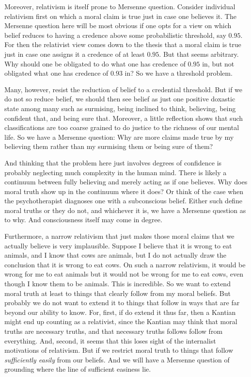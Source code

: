 Moreover, relativism is itself prone to
Mersenne question. Consider individual relativism first on which a moral claim is true just in case one believes
it. The Mersenne question here will be most obvious if one opts for a view on which belief reduces to having a
credence above some probabilistic threshold, say $0.95$. For then the relativist view comes down to the thesis
that a moral claim is true just in case one assigns it a credence of at least $0.95$. But that seems arbitrary.
Why should one be obligated to do what one has credence of $0.95$ in, but not obligated what one has credence of $0.93$ in?
So we have a threshold problem.

Many, however, resist the reduction of belief to a credential threshold. But if we do not so reduce belief, we should
then see belief as just one positive doxastic state among many such as surmising, being inclined to think, believing,
being confident that, and being sure that. Moreover, a little reflection shows that
such classifications are too coarse grained to do justice to the richness of our mental life. So we have a Mersenne
question: Why are more claims made true by my believing them rather than my surmising them or being sure of them?

And thinking that the problem here just involves degrees of confidence is probably neglecting much complexity in the human
mind. There is likely a continuum between fully believing and merely acting as if one believes. Why does moral truth show up
in the continuum where it does? Or think of the case when the psychotherapist diagnoses one with a subconscious belief.
Either such define moral truths or they do not, and whichever it is, we have a Mersenne question as to why. And consciousness
itself may come in degree.

Furthermore, a narrow relativism that just makes those moral claims that we actually believe is very implausible. Suppose I believe that it is wrong
to eat animals, and I know that cows are animals, but I do not actually draw the conclusion that it is wrong to eat cows.
On such a narrow relativism, it would be wrong for me to eat animals but it would not be wrong for me to eat cows, even though
I know them to be animals. This is incredible. So we want to extend moral truth at least to things that clearly follow from my moral beliefs.
But probably we do not want to extend it to things that follow in ways that are far beyond our ability to know. For, first,
if do extend it thus far, then a Kantian might end up counting as a relativist, since the Kantian may think that moral truths are
necessary truths, and that necessary truths follows follow from everything. And, second, it seems that this loses sight of the 
internalist motivations of relativism. But if we restrict moral truth to things that follow \textit{sufficiently easily} from
our beliefs. And we will have a Mersenne question of grounding where the line of sufficient easiness lie.


